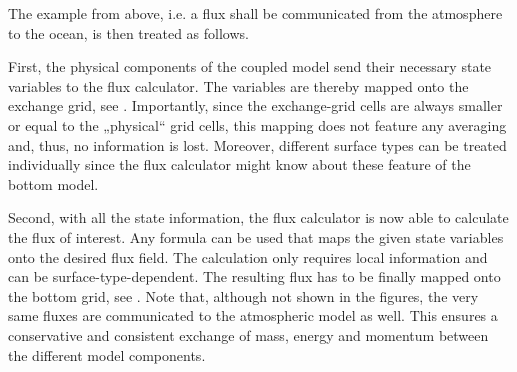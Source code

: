 \documentclass[a4paper,titlepage]{scrartcl}
\begin{document}
The example from above, i.e. a flux shall be communicated from the atmosphere to the ocean, is then treated as follows.

First, the physical components of the coupled model send their necessary state variables to the flux calculator. 
%
The variables are thereby mapped onto the exchange grid, see .
%
Importantly, since the exchange-grid cells are always smaller or equal to the „physical“ grid cells, this mapping does not feature any averaging and,
%
thus, no information is lost.
%
Moreover, different surface types can be treated individually since the flux calculator might know about these feature of the bottom model.

Second, with all the state information, the flux calculator is now able to calculate the flux of interest.
%
Any formula can be used that maps the given state variables onto the desired flux field. 
%
The calculation only requires local information and can be surface-type-dependent.
%
The resulting flux has to be finally mapped onto the bottom grid, see .
% 
Note that, although not shown in the figures, the very same fluxes are communicated to the atmospheric model as well.
%
This ensures a conservative and consistent exchange of mass, energy and momentum between the different model components. 
\end{document}
